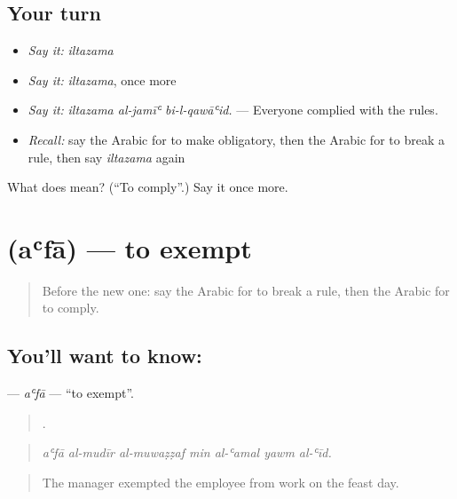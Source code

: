 \subsection*{Your turn}
\begin{itemize}
\raggedright
  \item \emph{Say it:} \emph{iltazama}
  \item \emph{Say it:} \emph{iltazama}, once more
  \item \emph{Say it:} \emph{iltazama al-jamīʿ bi-l-qawāʿid.} — Everyone complied with the rules.
  \item \emph{Recall:} say the Arabic for to make obligatory, then the Arabic for to break a rule, then say \emph{iltazama} again
\end{itemize}

\begin{tcolorbox}[breakable,colback=teal!4,colframe=teal!35!black,title={Before you move on}]
What does  mean? (\textquotedblleft{}To comply\textquotedblright{}.) Say it once more.
\end{tcolorbox}
\section[\texorpdfstring{\ar{أعفى} (aʿfā)}{أعفى (aʿfā)}]{ (aʿfā) — to exempt}

\label{lesson:AR-C410-afa-exempt}



\begin{quote}
Before the new one: say the Arabic for to break a rule, then the Arabic for to comply.
\end{quote}

\subsection*{You'll want to know: }
\textbf{} — \emph{aʿfā} — \textquotedblleft{}to exempt\textquotedblright{}.

\begin{quote}
      .
\end{quote}

\begin{quote}
\emph{aʿfā al-mudīr al-muwaẓẓaf min al-ʿamal yawm al-ʿīd.}
\end{quote}

\begin{quote}
The manager exempted the employee from work on the feast day.
\end{quote}

